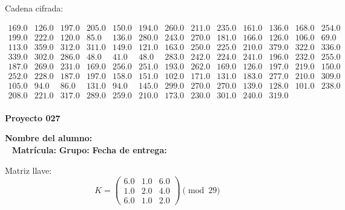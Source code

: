 \documentclass[12pt]{article}
\begin{document}
Cadena cifrada:
\begin{center}
$\begin{array}{lllllllllllll}
169.0 & 126.0 & 197.0 & 205.0 & 150.0 & 194.0 & 260.0 & 211.0 & 235.0 & 161.0 & 136.0 & 168.0 & 254.0\\
199.0 & 222.0 & 120.0 & 85.0 & 136.0 & 280.0 & 243.0 & 270.0 & 181.0 & 166.0 & 126.0 & 106.0 & 69.0\\
113.0 & 359.0 & 312.0 & 311.0 & 149.0 & 121.0 & 163.0 & 250.0 & 225.0 & 210.0 & 379.0 & 322.0 & 336.0\\
339.0 & 302.0 & 286.0 & 48.0 & 41.0 & 48.0 & 283.0 & 242.0 & 224.0 & 241.0 & 196.0 & 232.0 & 255.0\\
187.0 & 269.0 & 231.0 & 169.0 & 256.0 & 251.0 & 193.0 & 262.0 & 169.0 & 126.0 & 197.0 & 219.0 & 150.0\\
252.0 & 228.0 & 187.0 & 197.0 & 158.0 & 151.0 & 102.0 & 171.0 & 131.0 & 183.0 & 277.0 & 210.0 & 309.0\\
105.0 & 94.0 & 86.0 & 131.0 & 94.0 & 145.0 & 299.0 & 270.0 & 270.0 & 139.0 & 128.0 & 101.0 & 238.0\\
208.0 & 221.0 & 317.0 & 289.0 & 259.0 & 210.0 & 173.0 & 230.0 & 301.0 & 240.0 & 319.0\\
\end{array}$
\end{center}

\newpage


\textbf{Proyecto 027}

\textbf{Nombre del alumno:} \underline{\hspace{13cm}}\\\
\vspace{1cm}
\textbf{Matrícula:} \underline{\hspace{4cm}} \hspace{1cm}
\textbf{Grupo:} \underline{\hspace{2cm}}
\textbf{Fecha de entrega:} \underline{\hspace{2cm}}

\medskip

Matriz llave:
\[
K = \begin{pmatrix}
6.0 & 1.0 & 6.0\\
1.0 & 2.0 & 4.0\\
6.0 & 1.0 & 2.0
\end{pmatrix} \pmod{29}
\]
\end{document}
